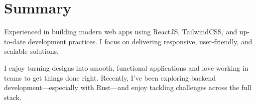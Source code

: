 \section*{Summary}
Experienced in building modern web apps using ReactJS, TailwindCSS, and up-to-date development practices. I focus on delivering responsive, user-friendly, and scalable solutions.

I enjoy turning designs into smooth, functional applications and love working in teams to get things done right. Recently, I’ve been exploring backend development—especially with Rust—and enjoy tackling challenges across the full stack.
